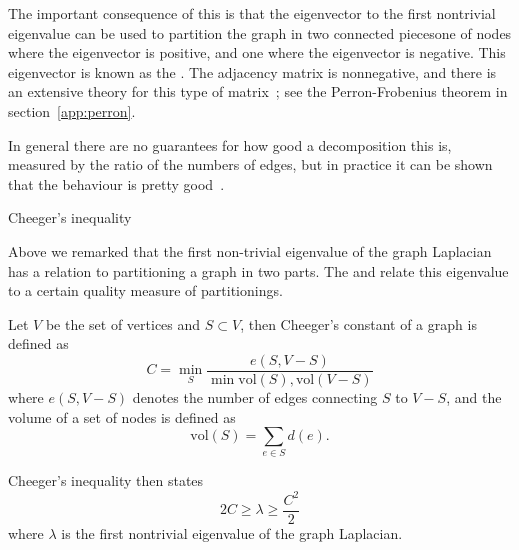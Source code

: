 The important consequence of this is that the eigenvector to the first
nontrivial eigenvalue can be used to partition the graph in two
connected piecesone of nodes where the eigenvector is positive, and
one where the eigenvector is negative. This eigenvector is known as
the .
The adjacency matrix is nonnegative, and there is an extensive theory
for this type of matrix~\cite{BePl:book}; see the Perron-Frobenius
theorem in section~\ref{app:perron}.

In general there are no guarantees for how good a decomposition this
is, measured by the ratio of the numbers of edges, but in practice it
can be shown that the behaviour is pretty
good~\cite{Spielman96spectralpartitioning}.


 {Cheeger's inequality}

Above we remarked that the first non-trivial eigenvalue of the graph
Laplacian has a relation to partitioning a graph in two parts. The
 and
 relate this eigenvalue to a
certain quality measure of partitionings.

Let $V$ be the set of vertices and $S\subset V$, then Cheeger's
constant of a graph is defined as
\[ C=\min_S \frac{e(S,V-S)}
        {\min{\mathord{\mathrm{vol}}(S),\mathord{\mathrm{vol}}(V-S)}}
\]
where $e(S,V-S)$ denotes the number of edges connecting $S$ to $V-S$,
and the volume of a set of nodes is defined as
\[ \mathord{\mathrm{vol}}(S) = \sum_{e\in S}d(e). \]

Cheeger's inequality then states
\[ 2C \geq \lambda \geq \frac{C^2}2 \]
where $\lambda$ is the first nontrivial eigenvalue of the graph
Laplacian.

